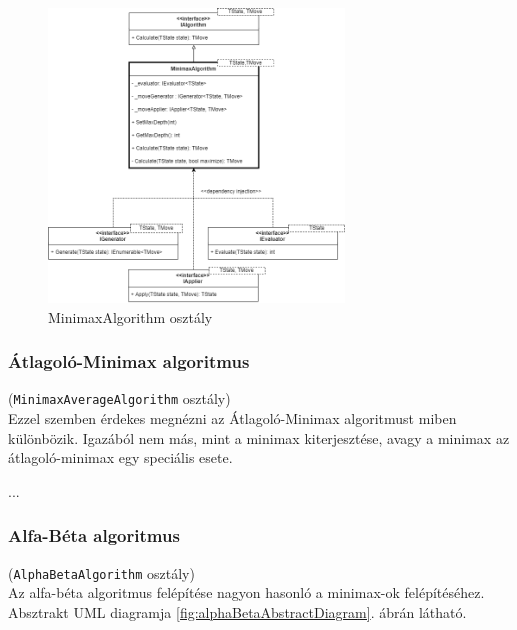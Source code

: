 \documentclass[twoside, a4paper, 12pt]{article}
\begin{document}
\begin{figure}[htbp]
	\centering
	\includegraphics[width=0.7\textwidth]{img/minimaxAbstractDiagram.png}
	\caption{MinimaxAlgorithm osztály}
	\label{fig:minimaxAbstractDiagram}
\end{figure}

\subsubsection{Átlagoló-Minimax algoritmus}
\noindent(\texttt{MinimaxAverageAlgorithm} osztály) \\
Ezzel szemben érdekes megnézni az Átlagoló-Minimax algoritmust miben különbözik. Igazából nem más, mint a minimax kiterjesztése, avagy a minimax az átlagoló-minimax egy speciális esete.

...

\subsubsection{Alfa-Béta algoritmus}
\noindent(\texttt{AlphaBetaAlgorithm} osztály) \\
Az alfa-béta algoritmus felépítése nagyon hasonló a minimax-ok felépítéséhez. Absztrakt UML diagramja \ref{fig:alphaBetaAbstractDiagram}. ábrán látható.
\end{document}
